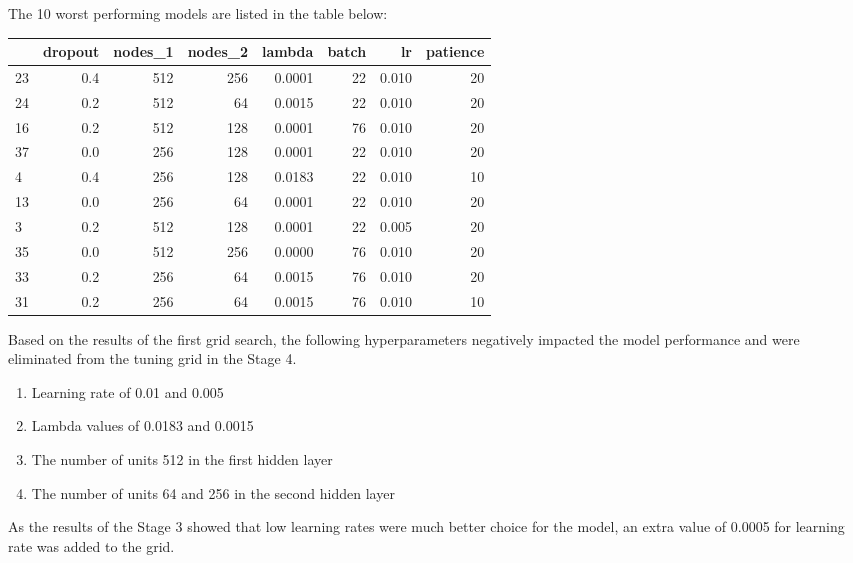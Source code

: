 \documentclass[]{article}
\providecommand{\tightlist}{%
  \setlength{\itemsep}{0pt}\setlength{\parskip}{0pt}}
\begin{document}
The 10 worst performing models are listed in the table below:

\begin{table}[H]
\centering
\begin{tabular}{l|r|r|r|r|r|r|r}
\hline
  & dropout & nodes\_1 & nodes\_2 & lambda & batch & lr & patience\\
\hline
23 & 0.4 & 512 & 256 & 0.0001 & 22 & 0.010 & 20\\
\hline
24 & 0.2 & 512 & 64 & 0.0015 & 22 & 0.010 & 20\\
\hline
16 & 0.2 & 512 & 128 & 0.0001 & 76 & 0.010 & 20\\
\hline
37 & 0.0 & 256 & 128 & 0.0001 & 22 & 0.010 & 20\\
\hline
4 & 0.4 & 256 & 128 & 0.0183 & 22 & 0.010 & 10\\
\hline
13 & 0.0 & 256 & 64 & 0.0001 & 22 & 0.010 & 20\\
\hline
3 & 0.2 & 512 & 128 & 0.0001 & 22 & 0.005 & 20\\
\hline
35 & 0.0 & 512 & 256 & 0.0000 & 76 & 0.010 & 20\\
\hline
33 & 0.2 & 256 & 64 & 0.0015 & 76 & 0.010 & 20\\
\hline
31 & 0.2 & 256 & 64 & 0.0015 & 76 & 0.010 & 10\\
\hline
\end{tabular}
\end{table}

Based on the results of the first grid search, the following
hyperparameters negatively impacted the model performance and were
eliminated from the tuning grid in the Stage 4.

\begin{enumerate}
\def\labelenumi{\arabic{enumi}.}
\tightlist
\item
  Learning rate of 0.01 and 0.005
\item
  Lambda values of 0.0183 and 0.0015
\item
  The number of units 512 in the first hidden layer
\item
  The number of units 64 and 256 in the second hidden layer
\end{enumerate}

As the results of the Stage 3 showed that low learning rates were much
better choice for the model, an extra value of 0.0005 for learning rate
was added to the grid.
\end{document}

